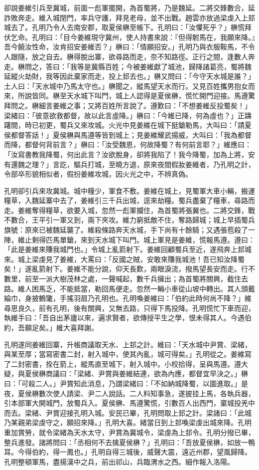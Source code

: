 卻說姜維引兵至冀城，前面一彪軍擺開，為首蜀將，乃是魏延。二將交鋒數合，延詐敗奔走。維入城閉門，率兵守護，拜見老母，並不出戰。趙雲亦放過梁虔入上邽城去了。孔明乃令人去南安郡，取夏侯楙至帳下。孔明曰：「汝懼死乎？」楙慌拜伏乞命。孔明曰：「目今姜維現守冀州，使人持書來說：『但得駙馬在，我願來降。』吾今饒汝性命，汝肯招安姜維否？」楙曰：「情願招安。」孔明乃與衣服鞍馬，不令人跟隨，放之自去。楙得脫出寨，欲尋路而走，奈不知路徑。正行之間，逢數人奔走。楙問之，答曰：「我等是冀縣百姓；今被姜維獻了城池，歸降諸葛亮，蜀將魏延縱火劫財，我等因此棄家而走，投上邽去也。」楙又問曰：「今守天水城是誰？」土人曰：「天水城中乃馬太守也。」楙聞之，縱馬望天水而行。又見百姓攜男抱女而來，所說皆同。楙至天水城下叫門，城上人認得是夏侯楙，慌忙開門迎接。馬遵驚拜問之。楙細言姜維之事；又將百姓所言說了。遵歎曰：「不想姜維反投蜀矣！」梁緒曰：「彼意欲救都督，故以此言虛降。」楙曰：「今維已降，何為虛也？」正躊躇間，時已初更，蜀兵又來攻城。火光中見姜維在城下挺鎗勒馬，大叫曰：「請夏侯都督答話！」夏侯楙與馬遵等皆到城上；見姜維耀武揚威，大叫曰：「我為都督而降，都督何背前言？」楙曰：「汝受魏恩，何故降蜀？有何前言耶？」維應曰：「汝寫書教我降蜀，何出此言？汝欲脫身，卻將我陷了！我今降蜀，加為上將，安有還魏之理？」言訖，驅兵打城，至曉方退，原來夜間假妝姜維者，乃孔明之計，令部卒形貌相似者，假扮姜維攻城，因火光之中，不辨真偽。

孔明卻引兵來攻冀城。城中糧少，軍食不敷。姜維在城上，見蜀軍大車小輛，搬運糧草，入魏延寨中去了，姜維引三千兵出城，逕來劫糧。蜀兵盡棄了糧車，尋路而走。姜維奪得糧草，欲要入城，忽然一彪軍攔住，為首蜀將張翼也。二將交鋒，戰不數合，王平引一軍又到，兩下夾攻。維力窮抵敵不住，奪路歸城；城上早插蜀兵旗號：原來已被魏延襲了。維殺條路奔天水城，手下尚有十餘騎；又遇張苞殺了一陣，維止剩得匹馬單鎗，來到天水城下叫門。城上軍見是姜維，慌報馬遵。遵曰：「此是姜維來賺我城門也。」令城上亂箭射下。姜維回顧蜀兵至近，遂飛奔上邽城來。城上梁虔見了姜維，大罵曰：「反國之賊，安敢來賺我城池！吾已知汝降蜀矣！」遂亂箭射下。姜維不能分說，仰天長歎，兩眼淚流，撥馬望長安而走。行不數里，前至一派大樹茂林之處，一聲喊起，數千兵擁出；為首蜀將關興，截住去路。維人困馬乏，不能抵當，勒回馬便走。忽然一輛小車從山坡中轉出。其人頭戴綸巾，身披鶴氅，手搖羽扇乃孔明也。孔明喚姜維曰：「伯約此時何尚不降？」維尋思良久，前有孔明，後有關興，又無去路，只得下馬投降。孔明慌忙下車而迎，執維手曰：「吾自出茅廬以來，遍求賢者，欲傳授平生之學，恨未得其人。今遇伯約，吾願足矣。」維大喜拜謝。

孔明遂同姜維回寨，升帳商議取天水、上邽之計。維曰：「天水城中尹賞、梁緒，與某至厚；當寫密書二封，射入城中，使其內亂，城可得矣。」孔明從之。姜維寫了二封密書，拴在箭上，縱馬直至城下，射入城中。小校拾得，呈與馬遵。遵大疑，與夏侯楙商議曰：「梁緒、尹賞與姜維結連，欲為內應，都督宜早決之。」楙曰：「可殺二人。」尹賞知此消息，乃謂梁緒曰：「不如納城降蜀，以圖進取。」是夜，夏侯楙數次使人請梁、尹二人說話。二人料知事急，遂披挂上馬，各執兵器，引本部軍大開城門，放蜀兵入。夏侯楙、馬遵驚慌，引數百人出西門，棄城投羌中而去。梁緒、尹賞迎接孔明入城。安民已畢，孔明問取上邽之計。梁諸曰：「此城乃某親弟梁虔守之，願招來降。」孔明大喜。緒當日到上邽喚梁虔出城來降。孔明重加賞勞，就令梁緒為天水太守，尹賞為冀城令，梁虔為上邽令。孔明分撥已畢，整兵進發。諸將問曰：「丞相何不去擒夏侯楙？」孔明曰：「吾放夏侯楙，如放一鴨耳。今得伯約，得一鳳也。」孔明自得三城後，威聲大震，遠近州郡，望風歸降。孔明整頓軍馬，盡揚漢中之兵，前出祁山，兵臨渭水之西。細作報入洛陽。


